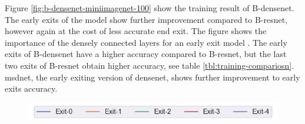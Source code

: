 Figure \ref{fig:b-densenet-miniimagenet-100} show the training result of B-\gls{densenet}. The early exits of the model show further improvement compared to B-\gls{resnet}, however again at the cost of less accurate end exit. The figure shows the importance of the densely connected layers for an early exit model \cite{huang_multi-scale_2017}. The early exits of B-\gls{densenet} have a higher accuracy compared to B-\gls{resnet}, but the last two exits of B-\gls{resnet} obtain higher accuracy, see table \ref{tbl:training-compariosn}. \gls{msdnet}, the early exiting version of \gls{densenet}, shows further improvement to early exits accuracy.

\begin{figure}
	\centering
	\captionsetup[subfigure]{justification=centering, farskip=1pt,captionskip=1pt}
	\includegraphics[width=.5\textwidth]{figures/training_plots/msdnet_exit_legend}
	\hfill

\end{figure}
